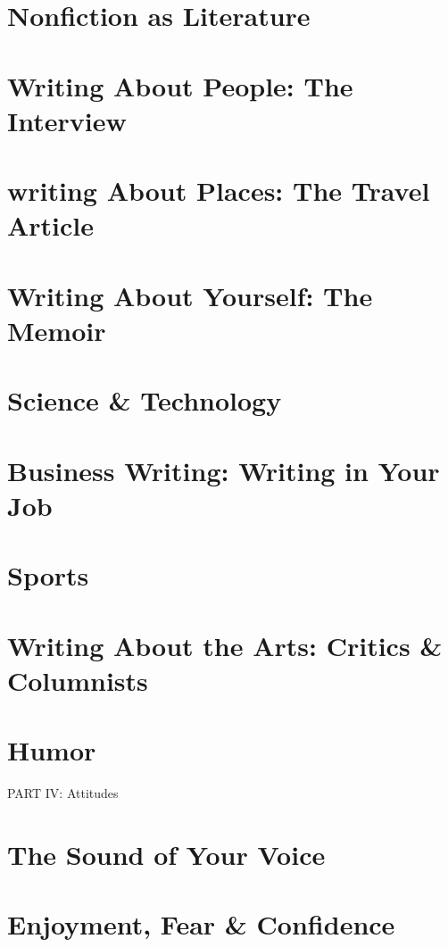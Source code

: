 \documentclass[oneside]{book}
\numberwithin{equation}{section}
\begin{document}
\section{Nonfiction as Literature}

\section{Writing About People: The Interview}

\section{writing About Places: The Travel Article}

\section{Writing About Yourself: The Memoir}

\section{Science \& Technology}

\section{Business Writing: Writing in Your Job}

\section{Sports}

\section{Writing About the Arts: Critics \& Columnists}

\section{Humor}

\begin{center}
	\LARGE PART IV: Attitudes
\end{center}

\section{The Sound of Your Voice}

\section{Enjoyment, Fear \& Confidence}
\end{document}
